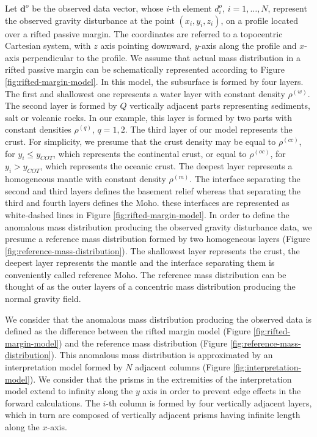 \documentclass[manuscript]{geophysics}
\begin{document}
Let $\mathbf{d}^{o}$ be the observed data vector, whose $i$-th element $d^{o}_{i}$, 
$i = 1, \dots, N$, represent the observed gravity disturbance at the point 
$(x_{i}, y_{i}, z_{i})$, on a profile located over a rifted passive margin. The
coordinates are referred to a topocentric Cartesian system, with $z$ axis pointing
downward, $y$-axis along the profile and $x$-axis perpendicular to the profile. 
We assume that actual mass distribution in a rifted passive margin can be schematically
represented according to Figure \ref{fig:rifted-margin-model}. 
In this model, the subsurface is formed by four layers. 
The first and shallowest one represents a water layer with constant density
$\rho^{(w)}$. 
The second layer is formed by $Q$ vertically adjacent parts representing sediments,
salt or volcanic rocks.
In our example, this layer is formed by two parts with constant densities
$\rho^{(q)}$, $q = 1, 2$. 
The third layer of our model represents the crust. For simplicity, we presume that the
crust density may be equal to $\rho^{(cc)}$, for $y_{i} \le y_{COT}$, which
represents the continental crust, or equal to $\rho^{(oc)}$, for $y_{i} > y_{COT}$,
which represents the oceanic crust.
The deepest layer represents a homogeneous mantle with constant density
$\rho^{(m)}$. 
The interface separating the second and third layers defines the basement relief whereas
that separating the third and fourth layers defines the Moho. these interfaces are represented as white-dashed lines in Figure \ref{fig:rifted-margin-model}. 
In order to define the anomalous mass distribution producing the observed gravity
disturbance data, we presume a reference mass distribution formed by two homogeneous
layers (Figure \ref{fig:reference-mass-distribution}). The shallowest layer represents 
the crust, the deepest layer represents the mantle and the interface separating them
is conveniently called reference Moho.
The reference mass distribution can be thought of as the outer layers of a concentric
mass distribution producing the normal gravity field.

We consider that the anomalous mass distribution producing the observed data
is defined as the difference between the rifted margin model (Figure
\ref{fig:rifted-margin-model}) and the reference mass distribution (Figure
\ref{fig:reference-mass-distribution}).
This anomalous mass distribution is approximated by an interpretation model 
formed by $N$ adjacent columns (Figure \ref{fig:interpretation-model}). 
We consider that the prisms in the 
extremities of the interpretation model extend to infinity along the $y$ axis 
in order to prevent edge effects in the forward calculations. 
The $i$-th column is formed by four vertically adjacent 
layers, which in turn are composed of vertically adjacent prisms having infinite 
length along the $x$-axis. 
\end{document}
